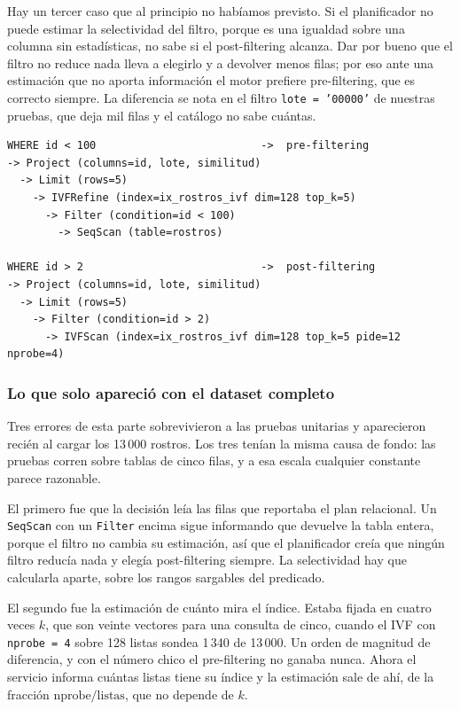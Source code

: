 \documentclass[a4paper,12pt]{article}
\begin{document}
Hay un tercer caso que al principio no habíamos previsto. Si el planificador no
puede estimar la selectividad del filtro, porque es una igualdad sobre una
columna sin estadísticas, no sabe si el post-filtering alcanza. Dar por bueno que
el filtro no reduce nada lleva a elegirlo y a devolver menos filas; por eso ante
una estimación que no aporta información el motor prefiere pre-filtering, que es
correcto siempre. La diferencia se nota en el filtro \texttt{lote = '00000'} de
nuestras pruebas, que deja mil filas y el catálogo no sabe cuántas.

\begin{lstlisting}[caption={Los dos planes para la misma foto de consulta}]
WHERE id < 100                          ->  pre-filtering
-> Project (columns=id, lote, similitud)
  -> Limit (rows=5)
    -> IVFRefine (index=ix_rostros_ivf dim=128 top_k=5)
      -> Filter (condition=id < 100)
        -> SeqScan (table=rostros)

WHERE id > 2                            ->  post-filtering
-> Project (columns=id, lote, similitud)
  -> Limit (rows=5)
    -> Filter (condition=id > 2)
      -> IVFScan (index=ix_rostros_ivf dim=128 top_k=5 pide=12 nprobe=4)
\end{lstlisting}

\subsubsection{Lo que solo apareció con el dataset completo}

Tres errores de esta parte sobrevivieron a las pruebas unitarias y aparecieron
recién al cargar los 13\,000 rostros. Los tres tenían la misma causa de fondo:
las pruebas corren sobre tablas de cinco filas, y a esa escala cualquier
constante parece razonable.

El primero fue que la decisión leía las filas que reportaba el plan relacional.
Un \texttt{SeqScan} con un \texttt{Filter} encima sigue informando que devuelve
la tabla entera, porque el filtro no cambia su estimación, así que el
planificador creía que ningún filtro reducía nada y elegía post-filtering
siempre. La selectividad hay que calcularla aparte, sobre los rangos sargables
del predicado.

El segundo fue la estimación de cuánto mira el índice. Estaba fijada en cuatro
veces $k$, que son veinte vectores para una consulta de cinco, cuando el IVF con
\texttt{nprobe = 4} sobre 128 listas sondea 1\,340 de 13\,000. Un orden de
magnitud de diferencia, y con el número chico el pre-filtering no ganaba nunca.
Ahora el servicio informa cuántas listas tiene su índice y la estimación sale de
ahí, de la fracción $\text{nprobe}/\text{listas}$, que no depende de $k$.
\end{document}
